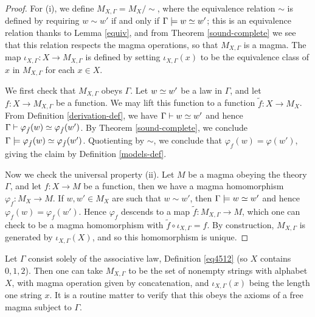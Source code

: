 \begin{proof}  For (i), we define $M_{X,\Gamma} = M_X/\sim$, where the equivalence relation $\sim$ is defined by requiring $w \sim w'$ if and only if $\Gamma \models w \simeq w'$; this is an equivalence relation thanks to Lemma \ref{equiv}, and from Theorem \ref{sound-complete} we see that this relation respects the magma operations, so that $M_{X,\Gamma}$ is a magma.  The map $\iota_{X,\Gamma}: X \to M_{X,\Gamma}$ is defined by setting $\iota_{X,\Gamma}(x)$ to be the equivalence class of $x$ in $M_{X,\Gamma}$ for each $x \in X$.

We first check that $M_{X,\Gamma}$ obeys $\Gamma$.  Let $w \simeq w'$ be a law in $\Gamma$, and let $f: X \to M_{X,\Gamma}$ be a function.  We may lift this function to a function $\tilde f: X \to M_X$.  From Definition \ref{derivation-def}, we have $\Gamma \vdash w \simeq w'$ and hence $\Gamma \vdash \varphi_{\tilde f}(w) \simeq \varphi_{\tilde f}(w')$.  By Theorem \ref{sound-complete}, we conclude $\Gamma \models \varphi_{\tilde f}(w) \simeq \varphi_{\tilde f}(w')$.  Quotienting by $\sim$, we conclude that $\varphi_f(w) = \varphi(w')$, giving the claim by Definition \ref{models-def}.

Now we check the universal property (ii).  Let $M$ be a magma obeying the theory $\Gamma$, and let $f: X \to M$ be a function, then we have a magma homomorphism $\varphi_f: M_X \to M$.  If $w, w' \in M_X$ are such that $w \sim w'$, then $\Gamma \models w \simeq w'$ and hence $\varphi_f(w) = \varphi_f(w')$.   Hence $\varphi_f$ descends to a map $\tilde f: M_{X,\Gamma} \to M$, which one can check to be a magma homomorphism with $\tilde f \circ \iota_{X,\Gamma} = f$.  By construction, $M_{X,\Gamma}$ is generated by $\iota_{X,\Gamma}(X)$, and so this homomorphism is unique.
\end{proof}

\begin{example}  Let $\Gamma$ consist solely of the associative law, Definition \ref{eq4512} (so $X$ contains $0,1,2$).  Then one can take $M_{X,\Gamma}$ to be the set of nonempty strings with alphabet $X$, with magma operation given by concatenation, and $\iota_{X,\Gamma}(x)$ being the length one string $x$.  It is a routine matter to verify that this obeys the axioms of a free magma subject to $\Gamma$.
\end{example}

